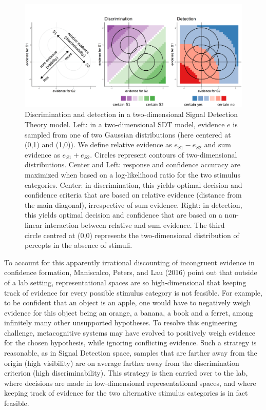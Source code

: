 \documentclass[
  english,
  man]{apa6}
\begin{document}
\begin{figure}
\includegraphics[width=\textwidth]{figures/2dmodel_enhanced} \caption[Discrimination and detection in a two-dimensional SDT model]{Discrimination and detection in a two-dimensional Signal Detection Theory model. Left: in a two-dimensional SDT model, evidence \(e\) is sampled from one of two Gaussian distributions (here centered at (0,1) and (1,0)). We define relative evidence as \(e_{S1}-e_{S2}\) and sum evidence as \(e_{S1}+e_{S2}\). Circles represent contours of two-dimensional distributions. Center and Left: response and confidence accuracy are maximized when based on a log-likelihood ratio for the two stimulus categories. Center: in discrimination, this yields optimal decision and confidence criteria that are based on relative evidence (distance from the main diagonal), irrespective of sum evidence. Right: in detection, this yields optimal decision and confidence that are based on a non-linear interaction between relative and sum evidence. The third circle centred at (0,0) represents the two-dimensional distribution of percepts in the absence of stimuli.}\label{fig:RC-2dmodel}
\end{figure}

To account for this apparently irrational discounting of incongruent evidence in confidence formation, Maniscalco, Peters, and Lau (2016) point out that outside of a lab setting, representational spaces are so high-dimensional that keeping track of evidence for every possible stimulus category is not feasible. For example, to be confident that an object is an apple, one would have to negatively weigh evidence for this object being an orange, a banana, a book and a ferret, among infinitely many other unsupported hypotheses. To resolve this engineering challenge, metacognitive systems may have evolved to positively weigh evidence for the chosen hypothesis, while ignoring conflicting evidence. Such a strategy is reasonable, as in Signal Detection space, samples that are farther away from the origin (high visibility) are on average farther away from the discrimination criterion (high discriminability). This strategy is then carried over to the lab, where decisions are made in low-dimensional representational spaces, and where keeping track of evidence for the two alternative stimulus categories is in fact feasible.
\end{document}
